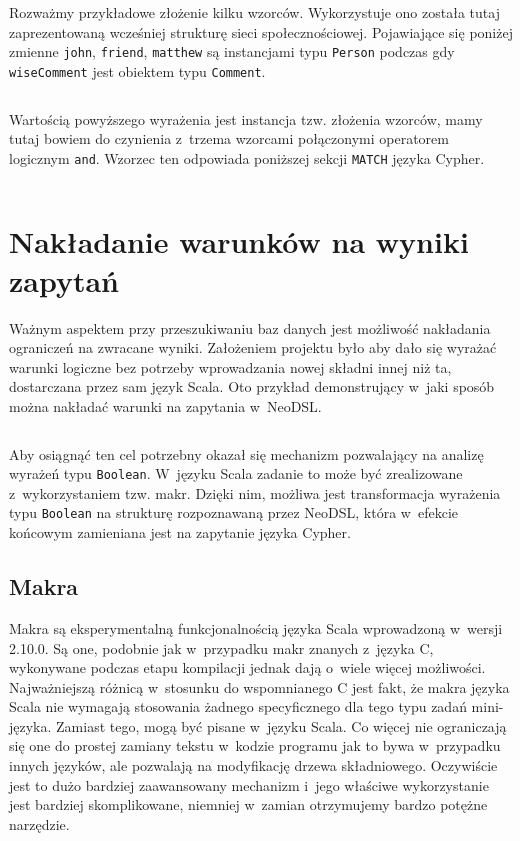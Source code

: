 \documentclass{xmgr}
\begin{document}
Rozważmy przykładowe złożenie kilku wzorców. Wykorzystuje ono została tutaj zaprezentowaną wcześniej strukturę sieci społecznościowej. Pojawiające się poniżej zmienne \texttt{john}, \texttt{friend}, \texttt{matthew} są instancjami typu \texttt{Person} podczas gdy \texttt{wiseComment} jest obiektem typu \texttt{Comment}.

\inputminted{scala}{listings/scala/dsl/patterns/functional-example-1.scala}

Wartością powyższego wyrażenia jest instancja tzw. złożenia wzorców, mamy tutaj bowiem do czynienia z~trzema wzorcami połączonymi operatorem logicznym \texttt{and}. Wzorzec ten odpowiada poniższej sekcji \texttt{MATCH} języka Cypher.

\inputminted{cypher}{listings/cypher/patterns-dsl-example.cypher}

\section{Nakładanie warunków na wyniki zapytań}

Ważnym aspektem przy przeszukiwaniu baz danych jest możliwość nakładania ograniczeń na zwracane wyniki. Założeniem projektu było aby dało się wyrażać warunki logiczne bez potrzeby wprowadzania nowej składni innej niż ta, dostarczana przez sam język Scala. Oto przykład demonstrujący w~jaki sposób można nakładać warunki na zapytania w~NeoDSL.

\inputminted{scala}{listings/scala/dsl/query-with-simple-condition.scala}

Aby osiągnąć ten cel potrzebny okazał się mechanizm pozwalający na analizę wyrażeń typu \texttt{Boolean}. W~języku Scala zadanie to może być zrealizowane z~wykorzystaniem tzw. makr. 
Dzięki nim, możliwa jest transformacja wyrażenia typu \texttt{Boolean} na strukturę rozpoznawaną przez NeoDSL, która w~efekcie końcowym zamieniana jest na zapytanie języka Cypher.

\subsection{Makra}

Makra są eksperymentalną funkcjonalnością języka Scala wprowadzoną w~wersji 2.10.0. Są one, podobnie jak w~przypadku makr znanych z~języka C, wykonywane podczas etapu kompilacji jednak dają o~wiele więcej możliwości. Najważniejszą różnicą w~stosunku do wspomnianego C jest fakt, że makra języka Scala nie wymagają stosowania żadnego specyficznego dla tego typu zadań mini-języka. Zamiast tego, mogą być pisane w~języku Scala. Co więcej nie ograniczają się one do prostej zamiany tekstu w~kodzie programu jak to bywa w~przypadku innych języków, ale pozwalają na modyfikację drzewa składniowego. Oczywiście jest to dużo bardziej zaawansowany mechanizm i~jego właściwe wykorzystanie jest bardziej skomplikowane, niemniej w~zamian otrzymujemy bardzo potężne narzędzie.
\end{document}
